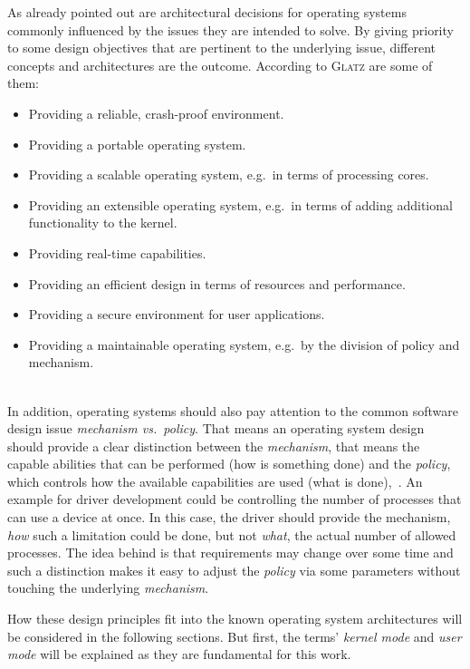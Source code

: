 As already pointed out are architectural decisions for operating systems commonly influenced by the issues they are intended to solve.
By giving priority to some design objectives that are pertinent to the underlying issue, different concepts and architectures are the outcome.
According to \textsc{Glatz}\cite{glatz2015betriebssysteme} are some of them:
\begin{itemize}
    \item Providing a reliable, crash-proof environment.
    \item Providing a portable operating system.
    \item Providing a scalable operating system, e.g.\ in terms of processing cores.
    \item Providing an extensible operating system, e.g.\ in terms of adding additional functionality to the kernel.
    \item Providing real-time capabilities.
    \item Providing an efficient design in terms of resources and performance.
    \item Providing a secure environment for user applications.
    \item Providing a maintainable operating system, e.g.\ by the division of policy and mechanism. 
\end{itemize}\ \\
%
In addition, operating systems should also pay attention to the common software design issue \textit{mechanism vs.\ policy}.
That means an operating system design should provide a clear distinction between the \textit{mechanism}, that means the capable abilities that can be performed (how is something done) and the \textit{policy}, which controls how the available capabilities are used (what is done)\cite{lfd430},~\cite{silberschatz2009operating}.
An example for driver development could be controlling the number of processes that can use a device at once.
In this case, the driver should provide the mechanism, \textit{how} such a limitation could be done, but not \textit{what}, the actual number of allowed processes. 
The idea behind is that requirements may change over some time and such a distinction makes it easy to adjust the \textit{policy} via some parameters without touching the underlying \textit{mechanism}\cite{silberschatz2009operating}.

How these design principles fit into the known operating system architectures will be considered in the following sections.
But first, the terms' \textit{kernel mode} and \textit{user mode} will be explained as they are fundamental for this work.

